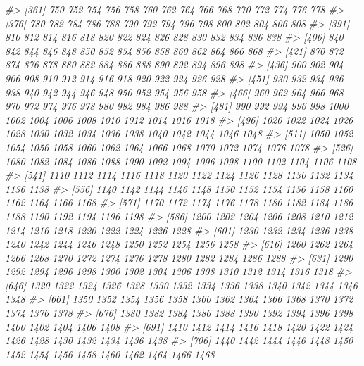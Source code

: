\documentclass[
]{article}
\newenvironment{Shaded}{\begin{snugshade}}{\end{snugshade}}
\newcommand{\CommentTok}[1]{\textcolor[rgb]{0.56,0.35,0.01}{\textit{#1}}}
\begin{document}
\begin{Shaded}
\begin{Highlighting}[]
\CommentTok{\#\textgreater{} [361]  750  752  754  756  758  760  762  764  766  768  770  772  774  776  778}
\CommentTok{\#\textgreater{} [376]  780  782  784  786  788  790  792  794  796  798  800  802  804  806  808}
\CommentTok{\#\textgreater{} [391]  810  812  814  816  818  820  822  824  826  828  830  832  834  836  838}
\CommentTok{\#\textgreater{} [406]  840  842  844  846  848  850  852  854  856  858  860  862  864  866  868}
\CommentTok{\#\textgreater{} [421]  870  872  874  876  878  880  882  884  886  888  890  892  894  896  898}
\CommentTok{\#\textgreater{} [436]  900  902  904  906  908  910  912  914  916  918  920  922  924  926  928}
\CommentTok{\#\textgreater{} [451]  930  932  934  936  938  940  942  944  946  948  950  952  954  956  958}
\CommentTok{\#\textgreater{} [466]  960  962  964  966  968  970  972  974  976  978  980  982  984  986  988}
\CommentTok{\#\textgreater{} [481]  990  992  994  996  998 1000 1002 1004 1006 1008 1010 1012 1014 1016 1018}
\CommentTok{\#\textgreater{} [496] 1020 1022 1024 1026 1028 1030 1032 1034 1036 1038 1040 1042 1044 1046 1048}
\CommentTok{\#\textgreater{} [511] 1050 1052 1054 1056 1058 1060 1062 1064 1066 1068 1070 1072 1074 1076 1078}
\CommentTok{\#\textgreater{} [526] 1080 1082 1084 1086 1088 1090 1092 1094 1096 1098 1100 1102 1104 1106 1108}
\CommentTok{\#\textgreater{} [541] 1110 1112 1114 1116 1118 1120 1122 1124 1126 1128 1130 1132 1134 1136 1138}
\CommentTok{\#\textgreater{} [556] 1140 1142 1144 1146 1148 1150 1152 1154 1156 1158 1160 1162 1164 1166 1168}
\CommentTok{\#\textgreater{} [571] 1170 1172 1174 1176 1178 1180 1182 1184 1186 1188 1190 1192 1194 1196 1198}
\CommentTok{\#\textgreater{} [586] 1200 1202 1204 1206 1208 1210 1212 1214 1216 1218 1220 1222 1224 1226 1228}
\CommentTok{\#\textgreater{} [601] 1230 1232 1234 1236 1238 1240 1242 1244 1246 1248 1250 1252 1254 1256 1258}
\CommentTok{\#\textgreater{} [616] 1260 1262 1264 1266 1268 1270 1272 1274 1276 1278 1280 1282 1284 1286 1288}
\CommentTok{\#\textgreater{} [631] 1290 1292 1294 1296 1298 1300 1302 1304 1306 1308 1310 1312 1314 1316 1318}
\CommentTok{\#\textgreater{} [646] 1320 1322 1324 1326 1328 1330 1332 1334 1336 1338 1340 1342 1344 1346 1348}
\CommentTok{\#\textgreater{} [661] 1350 1352 1354 1356 1358 1360 1362 1364 1366 1368 1370 1372 1374 1376 1378}
\CommentTok{\#\textgreater{} [676] 1380 1382 1384 1386 1388 1390 1392 1394 1396 1398 1400 1402 1404 1406 1408}
\CommentTok{\#\textgreater{} [691] 1410 1412 1414 1416 1418 1420 1422 1424 1426 1428 1430 1432 1434 1436 1438}
\CommentTok{\#\textgreater{} [706] 1440 1442 1444 1446 1448 1450 1452 1454 1456 1458 1460 1462 1464 1466 1468}

\end{Highlighting}
\end{Shaded}
\end{document}
